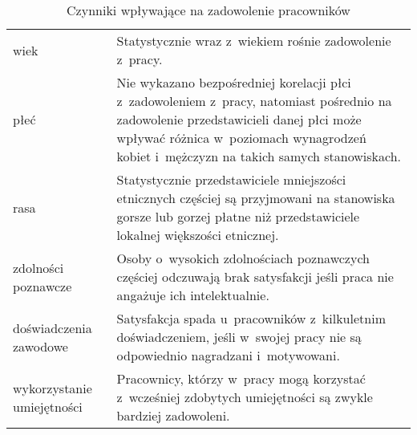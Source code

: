 \noindent\begin{minipage}{\textwidth}
             \begin{table}[H]
                 \raggedright\caption{Czynniki wpływające na zadowolenie pracowników\label{tabela:zadowolenie-pracownikow}}
                 \begin{center}
                     \begin{tabular}{|P{.2\textwidth}|P{.7\textwidth}|}

                         \hline
                          &
                          \\
                         \hline

                         wiek &
                         Statystycznie wraz z~wiekiem rośnie zadowolenie z~pracy.\\
                         \hline

                         płeć &
                         Nie wykazano bezpośredniej korelacji płci z~zadowoleniem z~pracy,
                         natomiast pośrednio na zadowolenie przedstawicieli danej płci może wpływać różnica w~poziomach wynagrodzeń kobiet i~mężczyzn na takich samych stanowiskach. \\
                         \hline

                         rasa &
                         Statystycznie przedstawiciele mniejszości etnicznych częściej są przyjmowani na stanowiska gorsze lub gorzej płatne niż przedstawiciele lokalnej większości etnicznej. \\
                         \hline

                         zdolności poznawcze &
                         Osoby o~wysokich zdolnościach poznawczych częściej odczuwają brak satysfakcji jeśli praca nie angażuje ich intelektualnie. \\
                         \hline

                         doświadczenia zawodowe &
                         Satysfakcja spada u~pracowników z~kilkuletnim doświadczeniem, jeśli w~swojej pracy nie są odpowiednio nagradzani i~motywowani. \\
                         \hline

                         wykorzystanie umiejętności &
                         Pracownicy, którzy w~pracy mogą korzystać z~wcześniej zdobytych umiejętności są zwykle bardziej zadowoleni. \\
                         \hline


\end{tabular}
\end{center}
\end{table}
\end{minipage}
